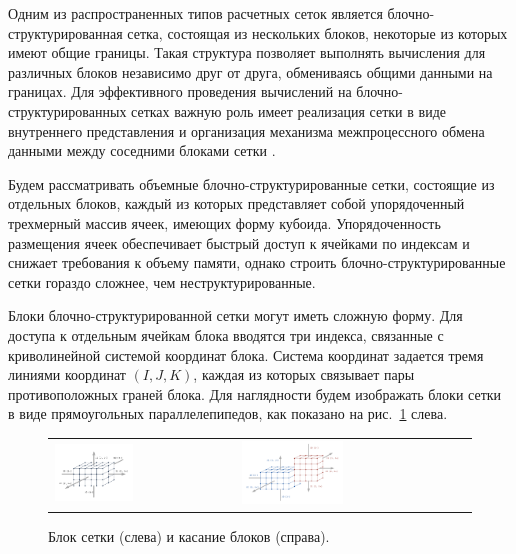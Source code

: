 Одним из распространенных типов расчетных сеток является блочно-структурированная сетка, состоящая из нескольких блоков, некоторые из которых имеют общие границы.
Такая структура позволяет выполнять вычисления для различных блоков независимо друг от друга, обмениваясь общими данными на границах.
Для эффективного проведения вычислений на блочно-структурированных сетках важную роль имеет реализация сетки в виде внутреннего представления и организация механизма межпроцессного обмена данными между соседними блоками сетки \cite{Rybakov2017Mesh}.

Будем рассматривать объемные блочно-структурированные сетки, состоящие из отдельных блоков, каждый из которых представляет собой упорядоченный трехмерный массив ячеек, имеющих форму кубоида.
Упорядоченность размещения ячеек обеспечивает быстрый доступ к ячейками по индексам и снижает требования к объему памяти, однако строить блочно-структурированные сетки гораздо сложнее, чем неструктурированные.

Блоки блочно-структурированной сетки могут иметь сложную форму.
Для доступа к отдельным ячейкам блока вводятся три индекса, связанные с криволинейной системой координат блока.
Система координат задается тремя линиями координат $(I, J, K)$, каждая из которых связывает пары противоположных граней блока.
Для наглядности будем изображать блоки сетки в виде прямоугольных параллелепипедов, как показано на рис.~\ref{fig:text_2_block_block} слева.

\begin{figure}[ht]
\centering
\begin{tabular}{ll}
\includegraphics[width=0.45\textwidth]{fig/par_1-block.pdf}
&
\includegraphics[width=0.45\textwidth]{fig/par_2-block-block.pdf}
\end{tabular}
\singlespacing
{}\caption{Блок сетки (слева) и касание блоков (справа).}
\label{fig:text_2_block_block}
\end{figure}

